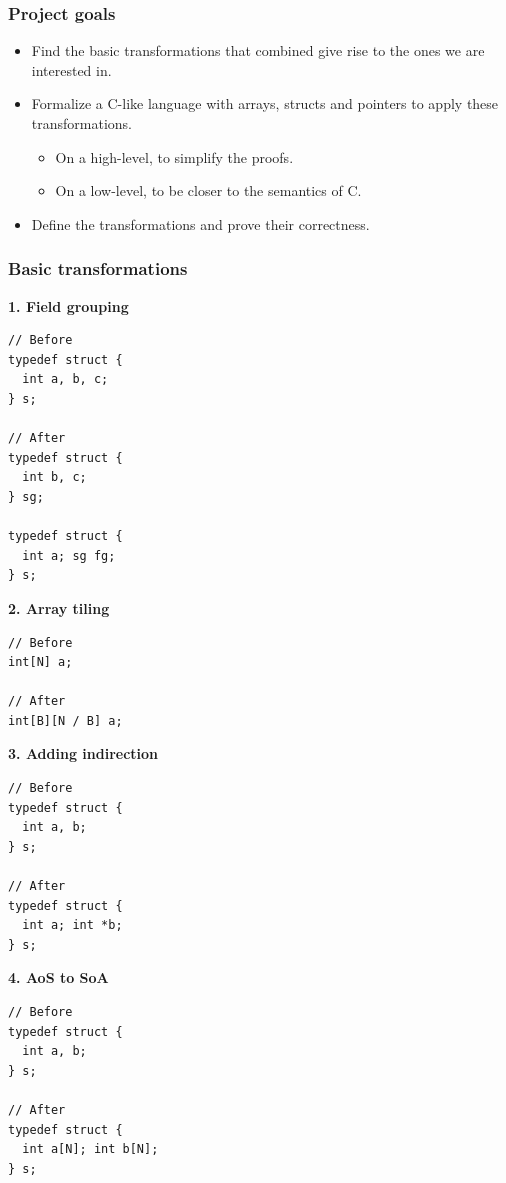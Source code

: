 \begin{frame}[fragile]
\frametitle{Project goals}

\begin{itemize}
	\setlength\itemsep{1.5em}
	\item Find the basic transformations that combined give rise to the ones we are interested in.\\
	\item Formalize a C-like language with arrays, structs and pointers to apply these transformations.
	\begin{itemize}
		\item On a high-level, to simplify the proofs.
		\item On a low-level, to be closer to the semantics of C.
	\end{itemize}
	\item Define the transformations and prove their correctness.
\end{itemize}

\end{frame}


\begin{frame}[fragile]
\frametitle{Basic transformations}

\begin{center}
\begin{minipage}{0.45\linewidth}
\textbf{\small 1. Field grouping}
\begin{lstlisting}[style=Cstyle, basicstyle=\scriptsize]
// Before
typedef struct {
  int a, b, c;
} s;

// After
typedef struct {
  int b, c;
} sg;

typedef struct {
  int a; sg fg;
} s;
\end{lstlisting}
\textbf{\small 2. Array tiling}
\begin{lstlisting}[style=Cstyle, basicstyle=\scriptsize]
// Before
int[N] a;

// After
int[B][N / B] a;
\end{lstlisting}
\end{minipage}%
\begin{minipage}{0.45\linewidth}
\textbf{\small 3. Adding indirection}
\begin{lstlisting}[style=Cstyle, basicstyle=\scriptsize]
// Before
typedef struct {
  int a, b;
} s;

// After
typedef struct {
  int a; int *b;
} s;
\end{lstlisting}
\textbf{\small 4. AoS to SoA}
\begin{lstlisting}[style=Cstyle, basicstyle=\scriptsize]
// Before
typedef struct {
  int a, b;
} s;

// After
typedef struct {
  int a[N]; int b[N];
} s;
\end{lstlisting}
\end{minipage}
\end{center}

\end{frame}


